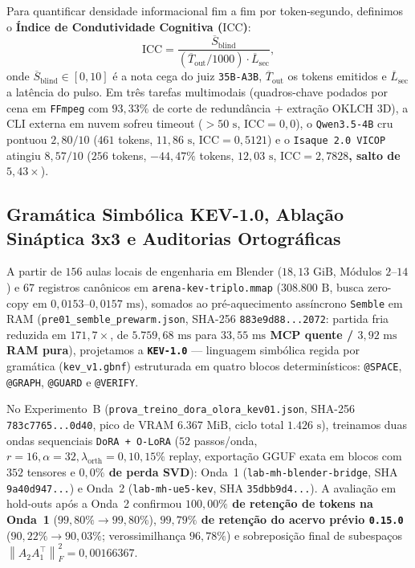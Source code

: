 \documentclass[10pt,a4paper]{article}
\begin{document}
Para quantificar densidade informacional fim a fim por token-segundo, definimos o \textbf{\'Indice de Condutividade Cognitiva ($\mathrm{ICC}$)}:
\begin{equation}
  \mathrm{ICC} = \frac{\overline{S}_{\text{blind}}}{\left(\overline{T}_{\text{out}} / 1000\right) \cdot \overline{L}_{\text{sec}}},
  \label{eq:icc}
\end{equation}
onde $\overline{S}_{\text{blind}} \in [0,10]$ \'e a nota cega do juiz \texttt{35B-A3B}, $\overline{T}_{\text{out}}$ os tokens emitidos e $\overline{L}_{\text{sec}}$ a lat\^encia do pulso. Em tr\^es tarefas multimodais (quadros-chave podados por cena em \texttt{FFmpeg} com $93,33\%$ de corte de redund\^ancia + extra\c{c}\~ao OKLCH 3D), a CLI externa em nuvem sofreu timeout ($>50\text{ s}$, $\mathrm{ICC}=0,0$), o \texttt{Qwen3.5-4B} cru pontuou $2,80/10$ ($461$ tokens, $11,86\text{ s}$, $\mathrm{ICC}=0,5121$) e o \texttt{Isaque 2.0 VICOP} atingiu \textbf{$8,57/10$} ($256$ tokens, $-44,47\%$ tokens, $12,03\text{ s}$, \textbf{$\mathrm{ICC}=2,7828$, salto de $5,43\times$}).

\subsection{Gram\'atica Simb\'olica KEV-1.0, Abla\c{c}\~ao Sin\'aptica 3x3 e Auditorias Ortogr\'aficas}

A partir de $156$ aulas locais de engenharia em Blender ($18,13\text{ GiB}$, M\'odulos $2\text{--}14$) e $67$ registros can\^onicos em \texttt{arena-kev-triplo.mmap} ($308.800\text{ B}$, busca zero-copy em \textbf{$0,0153\text{--}0,0157\text{ ms}$}), somados ao pr\'e-aquecimento ass\'incrono \texttt{Semble} em RAM (\texttt{pre01\_\allowbreak{}semble\_\allowbreak{}prewarm.json}, SHA-256 \texttt{883e9d88...2072}: partida fria reduzida em $171,7\times$, de $5.759,68\text{ ms}$ para \textbf{$33,55\text{ ms}$ MCP quente / $3,92\text{ ms}$ RAM pura}), projetamos a \textbf{\texttt{KEV-1.0}} --- linguagem simb\'olica regida por gram\'atica (\texttt{kev\_\allowbreak{}v1.gbnf}) estruturada em quatro blocos determin\'isticos: \texttt{@SPACE}, \texttt{@GRAPH}, \texttt{@GUARD} e \texttt{@VERIFY}.

No Experimento~B (\texttt{prova\_\allowbreak{}treino\_\allowbreak{}dora\_\allowbreak{}olora\_\allowbreak{}kev01.json}, SHA-256 \texttt{783c7765...0d40}, pico de VRAM $6.367\text{ MiB}$, ciclo total $1.426\text{ s}$), treinamos duas ondas sequenciais \texttt{DoRA + O-LoRA} ($52$ passos/onda, $r=16, \alpha=32, \lambda_{\text{orth}}=0,10, 15\%$ replay, exporta\c{c}\~ao GGUF exata em blocos com $352$ tensores e \textbf{$0,0\%$ de perda SVD}): Onda~1 (\texttt{lab-mh-blender-bridge}, SHA \texttt{9a40d947...}) e Onda~2 (\texttt{lab-mh-ue5-kev}, SHA \texttt{35dbb9d4...}). A avalia\c{c}\~ao em hold-outs ap\'os a Onda~2 confirmou \textbf{$100,00\%$ de reten\c{c}\~ao de tokens na Onda~1} ($99,80\% \to 99,80\%$), \textbf{$99,79\%$ de reten\c{c}\~ao do acervo pr\'evio \texttt{0.15.0}} ($90,22\% \to 90,03\%$; verossimilhan\c{c}a $96,78\%$) e sobreposi\c{c}\~ao final de subespa\c{c}os $\left\|A_2 A_1^\top\right\|_F^2 = 0,00166367$.
\end{document}
